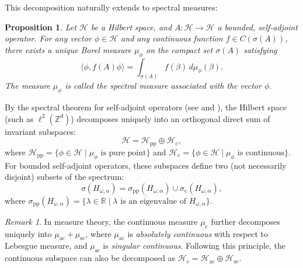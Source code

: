 \documentclass[11pt, a4paper, UKenglish, oneside]{book}
\theoremstyle{plain}
\newtheorem{proposition}[theorem]{Proposition}
\theoremstyle{remark}
\newtheorem{remark}[theorem]{Remark}
\theoremstyle{definition}
\numberwithin{equation}{section}
\numberwithin{theorem}{section}
\begin{document}
This decomposition naturally extends to spectral measures:

\begin{proposition}\label{def:spectralmeasuredef}
    Let $\mathcal{H}$ be a Hilbert space, and $A: \mathcal{H} \to \mathcal{H}$ a bounded, self-adjoint operator. For any vector $\phi \in \mathcal{H}$ and any continuous function $f \in C(\sigma(A))$, there exists a unique Borel measure $\mu_{\phi}$ on the compact set $\sigma(A)$ satisfying 
    \begin{equation*}
        \langle \phi, f(A)\phi \rangle = \int_{\sigma(A)} f(\beta) \, d\mu_{\phi}(\beta).
    \end{equation*}
    The measure $\mu_\phi$ is called the \textit{spectral measure associated with the vector $\phi$}.
\end{proposition}

By the spectral theorem for self-adjoint operators (see \cite{rudin1987} and \cite{reedsimon1980}), the Hilbert space (such as $\ell^2(\mathbb{Z}^d)$) decomposes uniquely into an orthogonal direct sum of invariant subspaces:
\begin{equation}
    \mathcal{H} = \mathcal{H}_{\mathrm{pp}} \oplus \mathcal{H}_{\mathrm{c}},
\end{equation}
where $\mathcal{H}_{\mathrm{pp}} = \{ \phi \in \mathcal{H} \mid \mu_{\phi} \text{ is pure point} \}$ and $\mathcal{H}_{\mathrm{c}} = \{ \phi \in \mathcal{H} \mid \mu_{\phi} \text{ is continuous} \}$. For bounded self-adjoint operators, these subspaces define two (not necessarily disjoint) subsets of the spectrum:
\begin{equation}
    \sigma(H_{\omega, \alpha}) = \sigma_{\mathrm{pp}}(H_{\omega, \alpha}) \cup \sigma_{\mathrm{c}}(H_{\omega, \alpha}),
\end{equation}
where $\sigma_{\mathrm{pp}}(H_{\omega, \alpha}) = \overline{\{ \lambda \in \mathbb{R} \mid \lambda \text{ is an eigenvalue of } H_{\omega, \alpha} \}}$.

\begin{remark}
    In measure theory, the continuous measure $\mu_{\mathrm{c}}$ further decomposes uniquely into $\mu_{\mathrm{ac}} + \mu_{\mathrm{sc}}$, where $\mu_{\mathrm{ac}}$ is \textit{absolutely continuous} with respect to Lebesgue measure, and $\mu_{\mathrm{sc}}$ is \textit{singular continuous}. Following this principle, the continuous subspace can also be decomposed as $\mathcal{H}_{\mathrm{c}} = \mathcal{H}_{\mathrm{ac}} \oplus \mathcal{H}_{\mathrm{sc}}$.
\end{remark}
\end{document}
